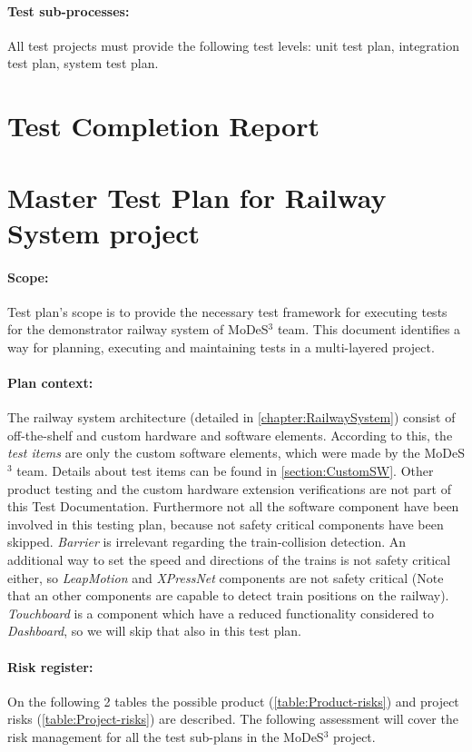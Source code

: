 \paragraph{Test sub-processes:} All test projects must provide the following test levels: unit test plan, integration test plan, system test plan.

\section{Test Completion Report}

\section{Master Test Plan for Railway System project}\label{section:MTP}
\paragraph{Scope:} Test plan's scope is to provide the necessary test framework for executing tests for the demonstrator railway system of MoDeS$^3$ team. This document identifies a way for planning, executing and maintaining tests in a multi-layered project.
\paragraph{Plan context:} The railway system architecture (detailed in \autoref{chapter:RailwaySystem}) consist of off-the-shelf and custom hardware and software elements. According to this, the \textit{test items} are only the custom software elements, which were made by the MoDeS$^3$ team. Details about test items can be found in \autoref{section:CustomSW}. Other product testing and the custom hardware extension verifications are not part of this Test Documentation. Furthermore not all the software component have been involved in this testing plan, because not safety critical components have been skipped. \textit{Barrier} is irrelevant regarding the train-collision detection. An additional way to set the speed and directions of the trains is not safety critical either, so \textit{LeapMotion} and \textit{XPressNet} components are not safety critical (Note that an other components are capable to detect train positions on the railway). \textit{Touchboard} is a component which have a reduced functionality considered to \textit{Dashboard}, so we will skip that also in this test plan.
\paragraph{Risk register:} On the following 2 tables the possible product (\autoref{table:Product-risks}) and project risks (\autoref{table:Project-risks}) are described. The following assessment will cover the risk management for all the test sub-plans in the MoDeS$^3$ project.

